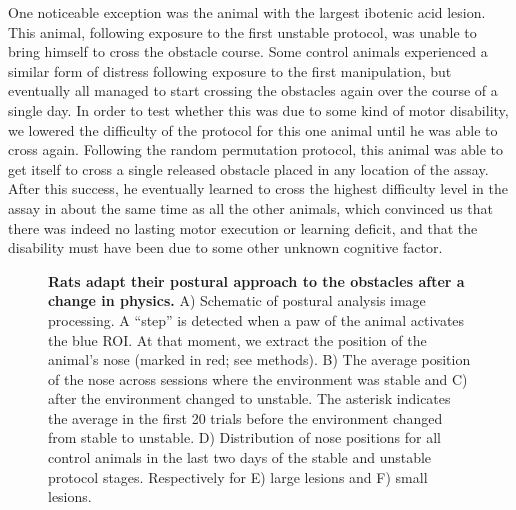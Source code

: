 One noticeable exception was the animal with the largest ibotenic acid lesion. This animal, following exposure to the first unstable protocol, was unable to bring himself to cross the obstacle course. Some control animals experienced a similar form of distress following exposure to the first manipulation, but eventually all managed to start crossing the obstacles again over the course of a single day. In order to test whether this was due to some kind of motor disability, we lowered the difficulty of the protocol for this one animal until he was able to cross again. Following the random permutation protocol, this animal was able to get itself to cross a single released obstacle placed in any location of the assay. After this success, he eventually learned to cross the highest difficulty level in the assay in about the same time as all the other animals, which convinced us that there was indeed no lasting motor execution or learning deficit, and that the disability must have been due to some other unknown cognitive factor. 

\begin{figure}
\centering

\caption{\textbf{Rats adapt their postural approach to the obstacles after a change in physics.} A) Schematic of postural analysis image processing. A ``step'' is detected when a paw of the animal activates the blue ROI. At that moment, we extract the position of the animal's nose (marked in red; see methods). B) The average position of the nose across sessions where the environment was stable and C) after the environment changed to unstable. The asterisk indicates the average in the first 20 trials before the environment changed from stable to unstable. D) Distribution of nose positions for all control animals in the last two days of the stable and unstable protocol stages. Respectively for E) large lesions and F) small lesions.}
\label{fig:posture}
\end{figure}

